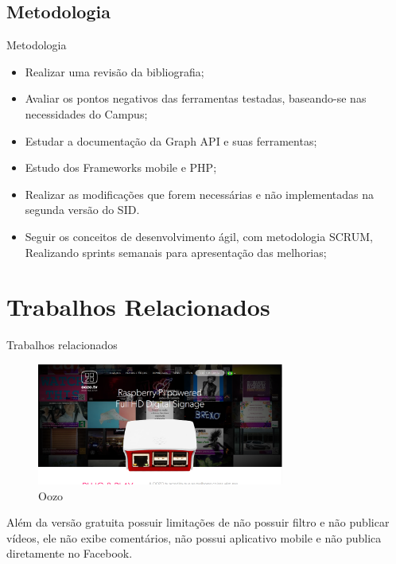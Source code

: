 \documentclass{aula-ifb}
\begin{document}
\subsection{Metodologia}
\begin{frame}{Metodologia}
	\begin{itemize}
   		\item Realizar uma revisão da bibliografia;
   		\vspace{10px}
   		\item Avaliar os pontos negativos das ferramentas testadas, baseando-se nas necessidades do Campus;
   		\vspace{10px}
   		\item Estudar a documentação da Graph API e suas ferramentas;
   		\vspace{10px}
   		\item Estudo dos Frameworks mobile e PHP;
   		\vspace{10px}
   		\item Realizar as modificações que forem necessárias e não implementadas na segunda versão do SID.
   		\vspace{10px}
   		\item Seguir os conceitos de desenvolvimento ágil, com metodologia SCRUM, Realizando sprints semanais para apresentação das melhorias;
	\end{itemize}
\end{frame}

\section{Trabalhos Relacionados} 
\begin{frame}{Trabalhos relacionados}
	\begin{figure}[h]
    	\includegraphics[height=4cm]{figuras/oozo.png}
    	\caption{Oozo}
	\end{figure}
	\begin{center}
	Além da versão gratuita possuir limitações de não possuir filtro e não publicar vídeos, ele não exibe comentários, não possui aplicativo mobile e não publica diretamente no Facebook.
	\end{center}
\end{frame}
\end{document}
